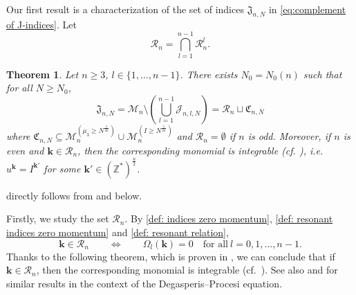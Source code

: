\documentclass[a4paper,10pt,reqno]{article}
\theoremstyle{definition}
\theoremstyle{plain}
\newtheorem{theorem}[definition]{Theorem}
\theoremstyle{plain}
\theoremstyle{definition}
\theoremstyle{plain}
\theoremstyle{plain}
\theoremstyle{plain}
\theoremstyle{definition}
\theoremstyle{definition}
\def \Z{\mathbb Z}
\def \M{\mathcal{M}}
\def \k{\bm{k}}
\def \cR{\mathcal{R}}
\begin{document}
\smallskip

Our first result is a characterization of the set of indices $\mathfrak{J}_{n,N}$ in \eqref{eq:complement of J-indices}.
Let 
\begin{equation} \label{def: normal form indices}
\cR_n = \bigcap_{l=1}^{n-1} \cR_n^l.
\end{equation}

\begin{theorem} \label{teorema multiindici rimasti}
Let $n \ge 3$, $l \in \{ 1, \ldots, n-1 \}$. There exists $N_0=N_0(n)$ such that for all $N\geq N_0$,
\begin{equation}\label{eq:multiindici rimasti}
\mathfrak{J}_{n,N} = \M_n \setminus \left ( \bigcup_{l = 1}^{n-1} \mathcal{J}_{n,l,N} \right ) = \cR_n \sqcup \mathfrak{C}_{n,N}
\end{equation}
where $\mathfrak{C}_{n,N} \subseteq \M_n^{(\mu_3 \ge N^{\frac{1}{2n}})} \cup \M_n^{(I \ge N^{\frac{1}{2n}})}$ and $\cR_n=\emptyset$ if $n$ is odd. Moreover, if $n$ is even and
$\k \in \cR_n$, then the corresponding monomial is integrable (cf. ), i.e. $u^{\k} = I^{\k'}$ for some $\k' \in (\Z^*)^{\frac{n}{2}}$.
\end{theorem}

 directly follows from  and  below.

\smallskip

Firstly,  we study the set $\cR_n$. By \eqref{def: indices zero momentum}, \eqref{def: resonant indices zero momentum} and \eqref{def: resonant relation},
\[
\k \in \cR_n \qquad \iff \qquad \Omega_l(\k)=0 \quad  \mbox{for all}\ l=0,1,\ldots ,n-1.
\]
Thanks to the following theorem, which is proven in , we can conclude that if $\k \in \cR_n$, then the corresponding monomial is integrable (cf.~). See also \cite[Section~4.1]{feola} and \cite[Proposition~3.4]{feola2} for similar results in the context of the Degasperis–Procesi equation.
\end{document}
